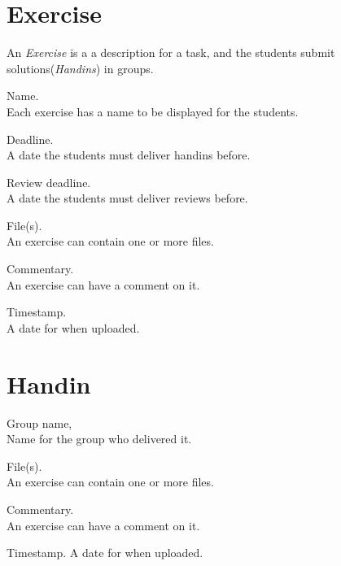 \documentclass[Main]{subfiles}
\begin{document}

\section{Exercise}\label{sec:exercise}
An \textit{Exercise} is a a description for a task, and the students submit solutions(\textit{Handins}) in groups.
\begin{DataIntro}
\end{DataIntro}



\begin{DataTable}

\Record
{Name. \\
Each exercise has a name to be displayed for the students.}
{}
{}

\Record
{Deadline. \\
A date the students must deliver handins before.}
{}
{}

\Record
{Review deadline. \\
A date the students must deliver reviews before.}
{}
{}

\Record
{File(s). \\
An exercise can contain one or more files.}
{}
{}


\Record
{Commentary. \\
An exercise can have a comment on it.}
{}
{}


\Record
{Timestamp. \\
A date for when uploaded.}
{}
{}
\end{DataTable}




\newpage

\section{Handin}

	
\begin{DataIntro}
\end{DataIntro}

\begin{DataTable}

\Record
{Group name, \\
Name for the group who delivered it.}
{}
{}

\Record
{File(s). \\
An exercise can contain one or more files.}
{}
{}


\Record
{Commentary. \\
An exercise can have a comment on it.}
{}
{}


\Record
{Timestamp.}
{A date for when uploaded.}
{}
\end{DataTable}
\end{document}
